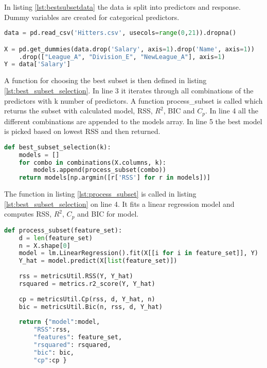 In listing \ref{lst:bestsubsetdata} the data is split into predictors and response. Dummy variables are created for categorical predictors.

\begin{lstlisting}[language=Python, label=lst:bestsubsetdata, caption=Data is split into predictors and response]
data = pd.read_csv('Hitters.csv', usecols=range(0,21)).dropna()

X = pd.get_dummies(data.drop('Salary', axis=1).drop('Name', axis=1))
	.drop(["League_A", "Division_E", "NewLeague_A"], axis=1)
Y = data['Salary']
\end{lstlisting}


A function for choosing the best subset is then defined in listing \ref{lst:best_subset_selection}. In line 3 it iterates through all combinations of the predictors with k number of predictors. A function process\_subset is called which returns the subset with calculated model, RSS, $R^2$, BIC and $C_p$. In line 4 all the different combinations are appended to the models array. In line 5 the best model is picked based on lowest RSS and then returned.

\begin{lstlisting}[language=Python, label=lst:best_subset_selection, caption=Function for choosing best subset]
def best_subset_selection(k):
	models = []
	for combo in combinations(X.columns, k):
		models.append(process_subset(combo))
	return models[np.argmin([r['RSS'] for r in models])]
\end{lstlisting}

The function in listing \ref{lst:process_subset} is called in listing \ref{lst:best_subset_selection} on line 4. It fits a linear regression model and computes RSS, $R^2$, $C_p$ and BIC for model.

\begin{lstlisting}[language=Python, label=lst:process_subset, caption=Function for computing metrics for subset]
def process_subset(feature_set):
	d = len(feature_set)
	n = X.shape[0]
	model = lm.LinearRegression().fit(X[[i for i in feature_set]], Y)
	Y_hat = model.predict(X[list(feature_set)])
	
	rss = metricsUtil.RSS(Y, Y_hat)  
	rsquared = metrics.r2_score(Y, Y_hat)
	
	cp = metricsUtil.Cp(rss, d, Y_hat, n)
	bic = metricsUtil.Bic(n, rss, d, Y_hat)
	
	return {"model":model, 
		"RSS":rss,
		"features": feature_set,
		"rsquared": rsquared,
		"bic": bic,
		"cp":cp }
\end{lstlisting}

